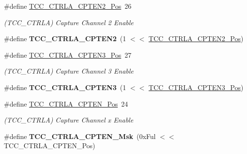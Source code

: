 \begin{DoxyCompactItemize}
\item 
\hypertarget{group___s_a_m_l21___t_c_c_ga975d230e1f73b99ffbaa71a049ab6e25}{}\#define \hyperlink{group___s_a_m_l21___t_c_c_ga975d230e1f73b99ffbaa71a049ab6e25}{T\+C\+C\+\_\+\+C\+T\+R\+L\+A\+\_\+\+C\+P\+T\+E\+N2\+\_\+\+Pos}~26\label{group___s_a_m_l21___t_c_c_ga975d230e1f73b99ffbaa71a049ab6e25}

\begin{DoxyCompactList}\small\item\em (T\+C\+C\+\_\+\+C\+T\+R\+L\+A) Capture Channel 2 Enable \end{DoxyCompactList}\item 
\hypertarget{group___s_a_m_l21___t_c_c_gaac2aee58d2431656473d78d100ccf651}{}\#define {\bfseries T\+C\+C\+\_\+\+C\+T\+R\+L\+A\+\_\+\+C\+P\+T\+E\+N2}~(1 $<$$<$ \hyperlink{group___s_a_m_l21___t_c_c_ga975d230e1f73b99ffbaa71a049ab6e25}{T\+C\+C\+\_\+\+C\+T\+R\+L\+A\+\_\+\+C\+P\+T\+E\+N2\+\_\+\+Pos})\label{group___s_a_m_l21___t_c_c_gaac2aee58d2431656473d78d100ccf651}

\item 
\hypertarget{group___s_a_m_l21___t_c_c_ga501abb5d9d1efa8aeb19d91a0f4560c9}{}\#define \hyperlink{group___s_a_m_l21___t_c_c_ga501abb5d9d1efa8aeb19d91a0f4560c9}{T\+C\+C\+\_\+\+C\+T\+R\+L\+A\+\_\+\+C\+P\+T\+E\+N3\+\_\+\+Pos}~27\label{group___s_a_m_l21___t_c_c_ga501abb5d9d1efa8aeb19d91a0f4560c9}

\begin{DoxyCompactList}\small\item\em (T\+C\+C\+\_\+\+C\+T\+R\+L\+A) Capture Channel 3 Enable \end{DoxyCompactList}\item 
\hypertarget{group___s_a_m_l21___t_c_c_gaf3f5ce52285bb5e1f706bd207f39c049}{}\#define {\bfseries T\+C\+C\+\_\+\+C\+T\+R\+L\+A\+\_\+\+C\+P\+T\+E\+N3}~(1 $<$$<$ \hyperlink{group___s_a_m_l21___t_c_c_ga501abb5d9d1efa8aeb19d91a0f4560c9}{T\+C\+C\+\_\+\+C\+T\+R\+L\+A\+\_\+\+C\+P\+T\+E\+N3\+\_\+\+Pos})\label{group___s_a_m_l21___t_c_c_gaf3f5ce52285bb5e1f706bd207f39c049}

\item 
\hypertarget{group___s_a_m_l21___t_c_c_gaf3b55ef061eed41402b7730cbf8085ca}{}\#define \hyperlink{group___s_a_m_l21___t_c_c_gaf3b55ef061eed41402b7730cbf8085ca}{T\+C\+C\+\_\+\+C\+T\+R\+L\+A\+\_\+\+C\+P\+T\+E\+N\+\_\+\+Pos}~24\label{group___s_a_m_l21___t_c_c_gaf3b55ef061eed41402b7730cbf8085ca}

\begin{DoxyCompactList}\small\item\em (T\+C\+C\+\_\+\+C\+T\+R\+L\+A) Capture Channel x Enable \end{DoxyCompactList}\item 
\hypertarget{group___s_a_m_l21___t_c_c_ga2f30f90d33e2497e47f67b14161f47d7}{}\#define {\bfseries T\+C\+C\+\_\+\+C\+T\+R\+L\+A\+\_\+\+C\+P\+T\+E\+N\+\_\+\+Msk}~(0x\+Ful $<$$<$ T\+C\+C\+\_\+\+C\+T\+R\+L\+A\+\_\+\+C\+P\+T\+E\+N\+\_\+\+Pos)\label{group___s_a_m_l21___t_c_c_ga2f30f90d33e2497e47f67b14161f47d7}


\end{DoxyCompactItemize}
